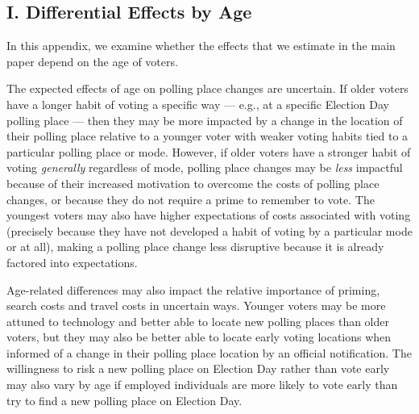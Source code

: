 \documentclass{cup_PSRM}
\begin{document}
\clearpage \newpage
\subsection{I. Differential Effects by Age}\label{appendix_age}
\setcounter{table}{0}
\setcounter{figure}{0}
\renewcommand{\thetable}{I\arabic{table}}
\renewcommand{\thefigure}{I\arabic{figure}}


\noindent In this appendix, we examine whether the effects that we estimate in the main paper depend on the age of voters.

The expected effects of age on polling place changes are uncertain.  If older voters have a longer habit of voting a specific way --- e.g., at a specific Election Day polling place --- then they may be more impacted by a change in the location of their polling place relative to a younger voter with weaker voting habits tied to a particular polling place or mode.  However, if older voters have a stronger habit of voting \emph{generally} regardless of mode, polling place changes may be \emph{less} impactful because of their increased motivation to overcome the costs of polling place changes, or because they do not require a prime to remember to vote.  The youngest voters may also have higher expectations of costs associated with voting (precisely because they have not developed a habit of voting by a particular mode or at all), making a polling place change less disruptive because it is already factored into expectations.

Age-related differences may also impact the relative importance of priming, search costs and travel costs in uncertain ways.  Younger voters may be more attuned to technology and better able to locate new polling places than older voters, but they may also be better able to locate early voting locations when informed of a change in their polling place location by an official notification.  The willingness to risk a new polling place on Election Day rather than vote early may also vary by age if employed individuals are more likely to vote early than try to find a new polling place on Election Day.
\end{document}
